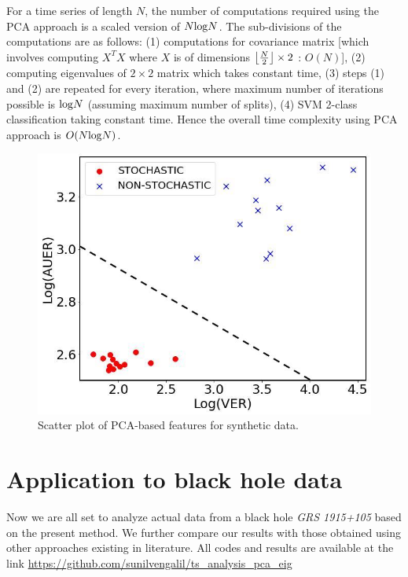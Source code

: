 \documentclass[journal]{IEEEtran}
\DeclarePairedDelimiter\floor{\lfloor}{\rfloor}
\begin{document}
	For a time series of length $N$, the number of computations required using the PCA approach is a scaled version of $N{\rm log}N$. The sub-divisions of the computations are as follows: (1) computations for covariance matrix [which involves computing $X^TX$  where $X$ is of dimensions $ {\floor*{\frac{N}{2}}} \times 2$ : $O(N)$], (2) computing eigenvalues of $2\times 2$ matrix which takes constant time, (3) steps (1) and (2) are repeated for every iteration, where 
maximum number of iterations possible is ${\rm log}N$ (assuming maximum number of splits), (4) SVM 2-class classification taking constant time. Hence the overall time complexity using PCA approach is $O(N{\rm log}N)$.
	\begin{figure}[h]
		\centering
		\includegraphics[width=0.7\linewidth]{Scatterplot_poc_variance_area_threshold_7.jpg}
		\caption{Scatter plot of PCA-based features for synthetic data.}
		\label{scatterplot}
	\end{figure}
	
	
	
	\section{Application to black hole data} \label{rnd}
	Now we are all set to analyze actual data from a black hole 
	\textit{GRS 1915+105} based on the present method. We further 
	compare our results with those obtained using 
	other approaches existing in literature. All codes and results are available at the link \href{https://github.com/sunilvengalil/ts_analysis_pca_eig}{https://github.com/sunilvengalil/ts\_analysis\_pca\_eig}
	
\end{document}
